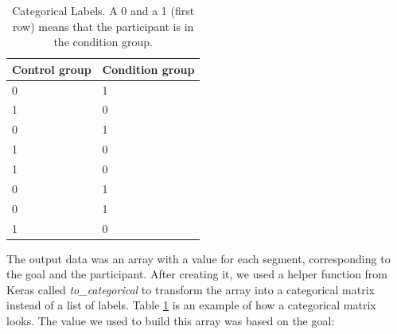 \begin{table}[h]
  \begin{center}
    \begin{tabular}{| l | l |}
      \hline
      \textbf{Control group} & \textbf{Condition group}  \\ \hline
      0                    &  1                \\ \hline
      1                    &  0                \\ \hline
      0                    &  1                \\ \hline
      1                    &  0                \\ \hline
      1                    &  0                \\ \hline
      0                    &  1                \\ \hline
      0                    &  1                \\ \hline
      1                    &  0                \\ \hline
    \end{tabular}
    \caption{Categorical Labels. A 0 and a 1 (first row) means that the participant is in the condition group.}
    \label{table:categorical_labels}
  \end{center}
\end{table}

The output data was an array with a value for each segment, corresponding to the goal and the participant. After creating it, we used a helper function from Keras called \textit{to\_categorical} to transform the array into a categorical matrix instead of a list of labels. Table \ref{table:categorical_labels} is an example of how a categorical matrix looks. The value we used to build this array was based on the goal:

